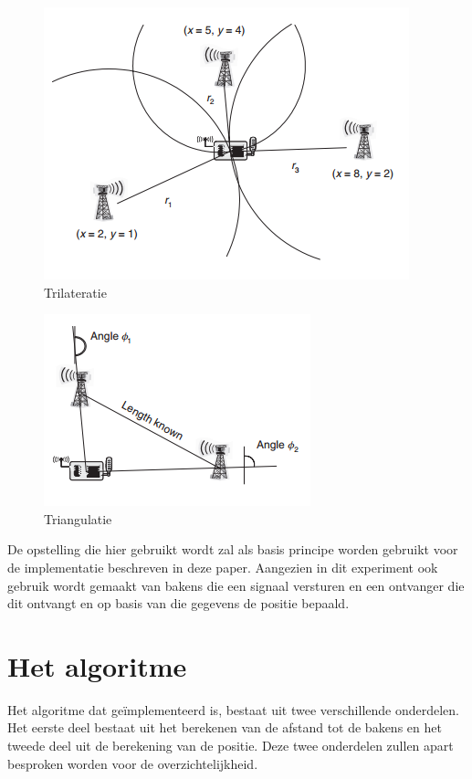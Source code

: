 \documentclass{article}
\begin{document}
\begin{figure}[h]
\centering\includegraphics[scale=0.75]{trilateratie.png}
\caption{Trilateratie \cite{h9}}
\label{trilateratie}
\end{figure}
\begin{figure}[h]
\centering\includegraphics[scale=0.75]{triangulatie.png}
\caption{Triangulatie \cite{h9}}
\label{triangulatie}
\end{figure}

De opstelling die hier gebruikt wordt zal als basis principe worden gebruikt voor de implementatie beschreven in deze paper. Aangezien in dit experiment ook gebruik wordt gemaakt van bakens die een signaal versturen en een ontvanger die dit ontvangt en op basis van die gegevens de positie bepaald. 

\section{Het algoritme}
Het algoritme dat ge\"{i}mplementeerd is, bestaat uit twee verschillende onderdelen. Het eerste deel bestaat uit het berekenen van de afstand tot de bakens en het tweede deel uit de berekening van de positie. Deze twee onderdelen zullen apart besproken worden voor de overzichtelijkheid.
	
\end{document}
